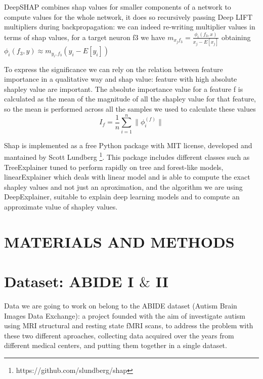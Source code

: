 \documentclass[12pt]{report}
\begin{document}
DeepSHAP combines shap values for smaller components of a network to compute values for the whole network, it does so recursively passing Deep LIFT multipliers during backpropagation: we can indeed re-writing multiplier values in terms of shap values, for a target neuron f3 we have $m_{x_j f_3} = \frac{\phi_i(f_3, x)}{x_j - E[x_j]}$ obtaining $\phi_i(f_3, y) \approx m_{y_i, f_3}(y_i - E[y_i])$


To express the significance we can rely on the relation between feature importance in a qualitative way and shap value: feature with high absolute shapley value are important.
The absolute importance value for a feature f is calculated as the mean of the magnitude of all the shapley value for that feature, so the mean is performed across all the samples we used to calculate these values
\begin{equation}\label{eq:shap_magnitude}
I_f = \frac{1}{n} \sum_{i = 1}^n \|\phi_i^{(f)}\|
\end{equation}

Shap is implemented as a free Python package with MIT license, developed and mantained by Scott Lundberg \footnote{https://github.com/slundberg/shap}.
This package includes different classes such as TreeExplainer tuned to perform rapidly on tree and forest-like models, linearExplainer which deals with linear model and is able to compute the exact shapley values and not just an aproximation, and the algorithm we are using DeepExplainer, suitable to explain deep learning models and to compute an approximate value of shapley values.





\chapter*{MATERIALS AND METHODS}

\chapter{Dataset: ABIDE I $\&$ II}


Data we are going to work on belong to the ABIDE dataset (Autism Brain Images Data Exchange): a project founded with the aim of investigate autism using MRI structural and resting state fMRI scans, to address the problem with these two different aproaches, collecting data acquired over the years from different medical centers, and putting them together in a single dataset.
\end{document}
